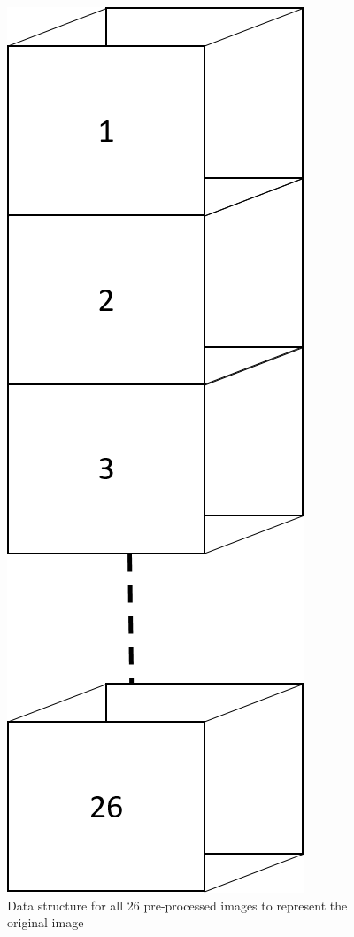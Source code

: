 \documentclass[11pt,twocolumn]{witseiepaper}
\begin{document}
	\begin{figure}[!h]
		\centering
		\includegraphics[scale=0.23]{data_structure.png}
		\caption{Data structure for all 26 pre-processed images to represent the original image}
		\label{fig: data_structure}
	\end{figure}
	
\end{document}
